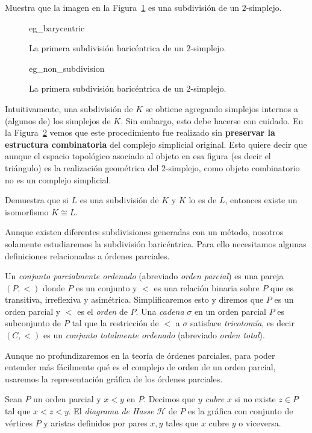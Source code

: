 \documentclass{standalone}
\begin{document}
	\begin{exercise}
		Muestra que la imagen en la Figura~\ref{fig:eg_barycentric} es una subdivisión de un $2$-simplejo.
	\end{exercise}
	
	\begin{figure}
		\centering
		{eg_barycentric}
		\caption{La primera subdivisión baricéntrica de un $2$-simplejo.}
		\label{fig:eg_barycentric}
	\end{figure}
	
	\begin{figure}
		\centering
		{eg_non_subdivision}
		\caption{La primera subdivisión baricéntrica de un $2$-simplejo.}
		\label{fig:eg_non_subdivision}
	\end{figure}
	
	Intuitivamente, una subdivisión de $K$ se obtiene agregando simplejos internos a (algunos de) los simplejos de $K$. Sin embargo, esto debe hacerse con cuidado. En la Figura~\ref{fig:eg_non_subdivision} vemos que este procedimiento fue realizado sin \textbf{preservar la estructura combinatoria} del complejo simplicial original. Esto quiere decir que aunque el espacio topológico asociado al objeto en esa figura (es decir el triángulo) es la realización geométrica del $2$-simplejo, como objeto combinatorio no es un complejo simplicial. 
	
	\begin{exercise}
		Demuestra que si $L$ es una subdivisión de $K$ y $K$ lo es de $L$, entonces existe un isomorfismo $K\cong L$.
	\end{exercise}

	Aunque existen diferentes subdivisiones generadas con un método, nosotros solamente estudiaremos la subdivisión baricéntrica. Para ello necesitamos algunas definiciones relacionadas a órdenes parciales.
	
	\begin{definition}\label{defn:poset}
		Un \emph{conjunto parcialmente ordenado} (abreviado \emph{orden parcial}) es una pareja $(P,<)$ donde $P$ es un conjunto y $<$ es una relación binaria sobre $P$ que es transitiva, irreflexiva y asimétrica. Simplificaremos esto y diremos que $P$ es un orden parcial y $<$ es el \emph{orden} de $P$. Una \emph{cadena} $\sigma$ en un orden parcial $P$ es subconjunto de $P$ tal que la restricción de $<$ a $
		\sigma$ satisface \emph{tricotomía}, es decir $(C,<)$ es un \emph{conjunto totalmente ordenado} (abreviado \emph{orden total}).
	\end{definition}
	Aunque no profundizaremos en la teoría de órdenes parciales, para poder entender más fácilmente qué es el complejo de orden de un orden parcial, usaremos la representación gráfica de los órdenes parciales. 
	\begin{definition}\label{defn:Hasse}
		Sean $P$ un orden parcial y $x<y$ en $P$. Decimos que $y$ \emph{cubre} $x$ si no existe $z\in P$ tal que $x<z<y$. El \emph{diagrama de Hasse} $\mathcal{H}$ de $P$ es la gráfica con conjunto de vértices $P$ y aristas definidos por pares ${x,y}$ tales que $x$ cubre $y$ o viceversa.
	\end{definition}
	
\end{document}
